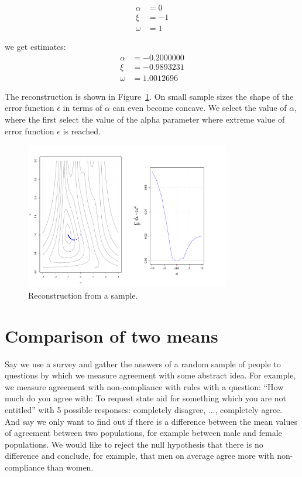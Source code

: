 \documentclass[10pt]{article}
\begin{document}
\begin{align*}
\alpha &= 0 \\
\xi &= -1 \\
\omega &= 1
\end{align*}

we get estimates:
\begin{align*}
\alpha &= -0.2000000 \\
\xi &= -0.9893231 \\
\omega &=  1.0012696
\end{align*}

The reconstruction is shown in Figure~\ref{fig: reconstruction_on_sample}. 
On small sample sizes the shape of the error function $\epsilon$ in terms of $\alpha$ can even become concave. We select the value of $\alpha$, where the first select the value of the alpha parameter where extreme value of error function $\epsilon$ is reached.

\begin{figure}
\centering
\includegraphics[width=0.8\textwidth]{alpha_0_trace_close_is_good_enough.pdf}
\caption{ Reconstruction from a sample.}
\label{fig: reconstruction_on_sample}
\end{figure}



\section{Comparison of two means} \label{sec: comparison-problem}
Say we use a survey and gather the answers of a random sample of people to questions by which we measure agreement with some abstract idea. For example, we measure agreement with non-compliance with rules with a question: ``How much do you agree with: To request state aid for something which you are not entitled'' with 5 possible responses: completely disagree, ..., completely agree. And say we only want to find out if there is a difference between the mean values of agreement between two populations, for example between male and female populations. We would like to reject the null hypothesis that there is no difference and conclude, for example, that men on average agree more with non-compliance than women.
\end{document}
